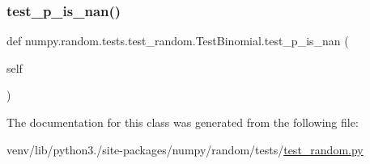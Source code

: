 \mbox{\label{classnumpy_1_1random_1_1tests_1_1test__random_1_1TestBinomial_a967748d18482fa4585def4c1119b1f87}} 
\subsubsection{\texorpdfstring{test\+\_\+p\+\_\+is\+\_\+nan()}{test\_p\_is\_nan()}}
{\footnotesize\ttfamily def numpy.\+random.\+tests.\+test\+\_\+random.\+Test\+Binomial.\+test\+\_\+p\+\_\+is\+\_\+nan (\begin{DoxyParamCaption}\item[{}]{self }\end{DoxyParamCaption})}



The documentation for this class was generated from the following file\+:\begin{DoxyCompactItemize}
\item 
venv/lib/python3./site-\/packages/numpy/random/tests/\hyperlink{test__random_8py}{test\+\_\+random.\+py}\end{DoxyCompactItemize}
